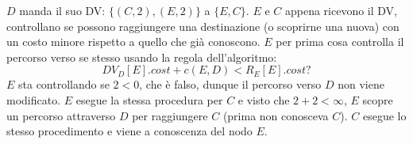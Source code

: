 \documentclass[10pt]{article}
\begin{document}
	\newline \newline
	$D$ manda il suo DV: $\{(C,2),(E,2)\}$ a $\{E,C\}$.
	\newline
	$E$ e $C$ appena ricevono il DV, controllano se possono raggiungere una destinazione (o scoprirne una nuova) con un costo minore rispetto a quello che già conoscono.
	\newline
	$E$ per prima cosa controlla il percorso verso se stesso usando la regola dell'algoritmo: $$DV_D[E].cost + c(E,D) < R_E[E].cost?$$
	$E$ sta controllando se $2<0$, che è falso, dunque il percorso verso $D$ non viene modificato.
	\newline
	$E$ esegue la stessa procedura per $C$ e visto che $2+2 < \infty$, $E$ scopre un percorso attraverso $D$ per raggiungere $C$ (prima non conosceva $C$).
	\newline
	$C$ esegue lo stesso procedimento e viene a conoscenza del nodo $E$.
\end{document}
